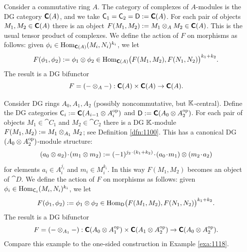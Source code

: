 \begin{exa} \label{exa:1966}
Consider a commutative ring $A$. The category of complexes of $A$-modules is 
the DG category $\boldsymbol{\mathsf{C}}(A)$, and we take 
$\operatorname{\mathsf{C}}_1 = \operatorname{\mathsf{C}}_2 = \operatorname{\mathsf{D}} := \boldsymbol{\mathsf{C}}(A)$. 
For each pair of objects 
$M_1, M_2 \in \boldsymbol{\mathsf{C}}(A)$ there is an object 
$F(M_1, M_2) := M_1 \otimes_{A} M_2 \in \boldsymbol{\mathsf{C}}(A)$.
This is the usual tensor product of complexes. 
We define the action of $F$ on morphisms as follows: given 
$\phi_i \in \operatorname{Hom}_{\boldsymbol{\mathsf{C}}(A)}(M_i, N_i)^{k_i}$, 
we let 
\[ F(\phi_1, \phi_2) := \phi_1 \otimes \phi_2 \in
\operatorname{Hom}_{\boldsymbol{\mathsf{C}}(A)} \bigl( F(M_1, M_2), F(N_1, N_2) \bigr)^{k_1 + k_2} . \]
The result is a DG bifunctor
\[ F = (- \otimes_A -) : \boldsymbol{\mathsf{C}}(A) \times \boldsymbol{\mathsf{C}}(A) \to \boldsymbol{\mathsf{C}}(A) . \]
\end{exa}

\begin{exa} \label{exa:1965}
Consider DG rings $A_0, A_1, A_2$ (possibly noncommutative, but 
$\mathbb{K}$-central). 
Define the DG categories 
$\operatorname{\mathsf{C}}_i := \boldsymbol{\mathsf{C}}(A_{i - 1} \otimes A_i^{\mathrm{op}})$
and
$\operatorname{\mathsf{D}} := \boldsymbol{\mathsf{C}}(A_{0} \otimes A_{2}^{\mathrm{op}})$.
For each pair of objects 
$M_1 \in \cat{C}_1$ and $M_2 \in \cat{C}_2$ there is a DG $\mathbb{K}$-module 
$F(M_1, M_2) := M_1 \otimes_{A_1} M_2$;
see Definition \ref{dfn:1100}.
This has a canonical DG $(A_{0} \otimes A_{2}^{\mathrm{op}})$-module structure:
\[  (a_0 \otimes a_2) \mspace{1.5mu}{\cdot}\mspace{1.5mu}  (m_1 \otimes m_2) := (-1)^{ j_2 \mspace{1.5mu}{\cdot}\mspace{1.5mu} (k_1 + k_2)} \mspace{1.5mu}{\cdot}\mspace{1.5mu}
(a_0 \mspace{1.5mu}{\cdot}\mspace{1.5mu} m_1) \otimes (m_2 \mspace{1.5mu}{\cdot}\mspace{1.5mu} a_2) \]
for elements 
$a_i \in A_i^{j_i}$  and $m_i \in M_i^{k_i}$. 
In this way $F(M_1, M_2)$ becomes an object of $\cat{D}$. 
We define the action of $F$ on morphisms as follows: given 
$\phi_i \in \operatorname{Hom}_{\operatorname{\mathsf{C}}_i}(M_i, N_i)^{k_i}$,
we let 
\[ F(\phi_1, \phi_2) := \phi_1 \otimes \phi_2 \in 
\operatorname{Hom}_{\operatorname{\mathsf{D}}} \bigl( F(M_1, M_2), F(N_1, N_2) \bigr)^{k_1 + k_2} . \]
The result is a DG bifunctor
\[ F = (- \otimes_{A_1} - ) : 
\boldsymbol{\mathsf{C}}(A_{0} \otimes A_1^{\mathrm{op}}) \times 
\boldsymbol{\mathsf{C}}(A_{1} \otimes A_2^{\mathrm{op}}) \to 
\boldsymbol{\mathsf{C}}(A_{0} \otimes A_2^{\mathrm{op}}) . \]
Compare this example to the one-sided construction in Example \ref{exa:1118}. 
\end{exa}


